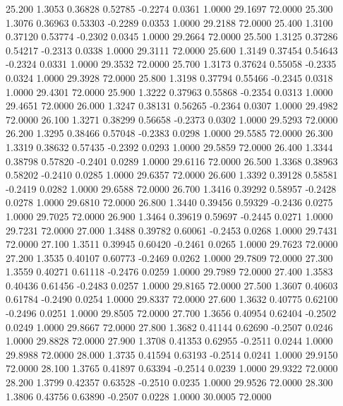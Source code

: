   25.200   1.3053   0.36828   0.52785  -0.2274   0.0361   1.0000  29.1697  72.0000
  25.300   1.3076   0.36963   0.53303  -0.2289   0.0353   1.0000  29.2188  72.0000
  25.400   1.3100   0.37120   0.53774  -0.2302   0.0345   1.0000  29.2664  72.0000
  25.500   1.3125   0.37286   0.54217  -0.2313   0.0338   1.0000  29.3111  72.0000
  25.600   1.3149   0.37454   0.54643  -0.2324   0.0331   1.0000  29.3532  72.0000
  25.700   1.3173   0.37624   0.55058  -0.2335   0.0324   1.0000  29.3928  72.0000
  25.800   1.3198   0.37794   0.55466  -0.2345   0.0318   1.0000  29.4301  72.0000
  25.900   1.3222   0.37963   0.55868  -0.2354   0.0313   1.0000  29.4651  72.0000
  26.000   1.3247   0.38131   0.56265  -0.2364   0.0307   1.0000  29.4982  72.0000
  26.100   1.3271   0.38299   0.56658  -0.2373   0.0302   1.0000  29.5293  72.0000
  26.200   1.3295   0.38466   0.57048  -0.2383   0.0298   1.0000  29.5585  72.0000
  26.300   1.3319   0.38632   0.57435  -0.2392   0.0293   1.0000  29.5859  72.0000
  26.400   1.3344   0.38798   0.57820  -0.2401   0.0289   1.0000  29.6116  72.0000
  26.500   1.3368   0.38963   0.58202  -0.2410   0.0285   1.0000  29.6357  72.0000
  26.600   1.3392   0.39128   0.58581  -0.2419   0.0282   1.0000  29.6588  72.0000
  26.700   1.3416   0.39292   0.58957  -0.2428   0.0278   1.0000  29.6810  72.0000
  26.800   1.3440   0.39456   0.59329  -0.2436   0.0275   1.0000  29.7025  72.0000
  26.900   1.3464   0.39619   0.59697  -0.2445   0.0271   1.0000  29.7231  72.0000
  27.000   1.3488   0.39782   0.60061  -0.2453   0.0268   1.0000  29.7431  72.0000
  27.100   1.3511   0.39945   0.60420  -0.2461   0.0265   1.0000  29.7623  72.0000
  27.200   1.3535   0.40107   0.60773  -0.2469   0.0262   1.0000  29.7809  72.0000
  27.300   1.3559   0.40271   0.61118  -0.2476   0.0259   1.0000  29.7989  72.0000
  27.400   1.3583   0.40436   0.61456  -0.2483   0.0257   1.0000  29.8165  72.0000
  27.500   1.3607   0.40603   0.61784  -0.2490   0.0254   1.0000  29.8337  72.0000
  27.600   1.3632   0.40775   0.62100  -0.2496   0.0251   1.0000  29.8505  72.0000
  27.700   1.3656   0.40954   0.62404  -0.2502   0.0249   1.0000  29.8667  72.0000
  27.800   1.3682   0.41144   0.62690  -0.2507   0.0246   1.0000  29.8828  72.0000
  27.900   1.3708   0.41353   0.62955  -0.2511   0.0244   1.0000  29.8988  72.0000
  28.000   1.3735   0.41594   0.63193  -0.2514   0.0241   1.0000  29.9150  72.0000
  28.100   1.3765   0.41897   0.63394  -0.2514   0.0239   1.0000  29.9322  72.0000
  28.200   1.3799   0.42357   0.63528  -0.2510   0.0235   1.0000  29.9526  72.0000
  28.300   1.3806   0.43756   0.63890  -0.2507   0.0228   1.0000  30.0005  72.0000
